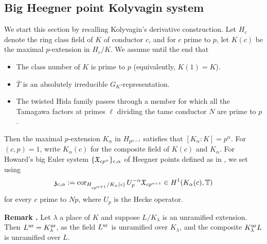 \documentclass[12pt]{amsart}
\numberwithin{equation}{section}
\newenvironment{rem}{\par\medskip\noindent\refstepcounter{thm}
\bgroup{\hspace*{-0.15 cm}\bf{Remark} \thethm.}\bgroup}{\egroup
\egroup\par\medskip} \parskip 2pt
\begin{document}
\subsection{Big Heegner point Kolyvagin system}
\label{sec:EStoKS}

We start this section by recalling Kolyvagin's derivative
construction. Let $H_c$ denote the ring class field of $K$ of
conductor $c$, and for $c$ prime to $p$, let $K(c)$ be the maximal
$p$-extension in $H_c/K$. We assume until the end that
\begin{itemize}
\item The class number of $K$ is prime to $p$ (equivalently, $K(1)=K$).
\item $\overline{T}$ is an absolutely irreducible $G_K$-representation.
\item The twisted Hida family passes through a member for which all the Tamagawa factors at primes $\ell$ dividing the tame conductor $N$ are prime to $p$.
\end{itemize}
Then the maximal $p$-extension
$K_\alpha$ in $H_{p^{\alpha+1}}$ satisfies that
$[K_\alpha:K]=p^{\alpha}$. For $(c,p)=1$, write $K_\alpha(c)$ for
the composite field of $K(c)$ and $K_\alpha$.
For Howard's big Euler system
$\{\frak{X}_{cp^{\alpha}}\}_{c,\alpha}$ of Heegner points defined as in \cite[\S2.2]{howard}, we set using \cite[Prop. 2.3.1]{howard}
$$\frak{z}_{c,\alpha}:=\textup{cor}_{H_{_{cp^{\alpha+1}}}/K_{\alpha}(c)}\,U_p^{-\alpha}\frak{X}_{cp^{\alpha+1}} \in H^1(K_\alpha(c),\mathbb{T})$$
for every $c$ prime to $Np$, where $U_p$ is the Hecke operator.
\begin{rem}
\label{rem:maxunr}
Let $\lambda$  a place of $K$ and suppose $L/K_\lambda$ is an unramified extension. Then $L^{\textup{ur}}=K_\lambda^{\textup{ur}}$, as the field $L^{\textup{ur}}$ is unramified over $K_\lambda$, and the composite $K_\lambda^{\textup {ur}}L$ is unramified over $L$.
\end{rem}
\end{document}
